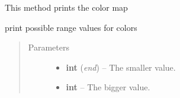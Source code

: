 \documentclass[a4paper,10pt,english]{sphinxmanual}
\begin{document}

\begin{fulllineitems}
\label{commands/apidoc/src:src.printcolors.print_color_map}
This method prints the color map

\end{fulllineitems}


\begin{fulllineitems}
\label{commands/apidoc/src:src.printcolors.print_color_range}
print possible range values for colors
\begin{quote}\begin{description}
\item[{Parameters}] \leavevmode\begin{itemize}
\item {} 
\textbf{int} (\emph{end}) -- The smaller value.

\item {} 
\textbf{int} -- The bigger value.

\end{itemize}

\end{description}\end{quote}

\end{fulllineitems}

\end{document}
